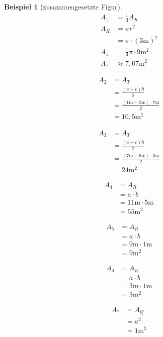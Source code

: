 \documentclass[a4paper]{book}%
\theoremstyle{definition}
\newtheorem{beispiel}{Beispiel}
\begin{document}
\begin{beispiel}[zusammengesetzte Figur]
    \begin{align}
      A_1 &= \frac{1}{4} A_K \\
       A_K &= \pi r^2 \\
       &= \pi \cdot (3\text{m})^2\\
       A_1 &= \frac{1}{4} \pi \cdot 9\text{m}^2\\
       A_1 & \approx 7,07\text{m}^2
    \end{align}

    \begin{align}
      A_2 &= A_T \\
       &= \frac{(a+c)h}{2}\\
       &= \frac{(1\text{m}+2\text{m}) \cdot 7\text{m}}{2}\\
       &= 10,5\text{m}^2
    \end{align}

    \begin{align}
      A_3 &= A_T \\
       &= \frac{(a+c)h}{2}\\
       &= \frac{(7\text{m}+9\text{m}) \cdot 3\text{m}}{2}\\
       &= 24\text{m}^2
    \end{align}

    \begin{align}
      A_4 &= A_R \\
       &= a \cdot b\\
       &= 11\text{m} \cdot 5\text{m}\\
       &= 55\text{m}^2
    \end{align}

    \begin{align}
      A_5 &= A_R \\
       &= a \cdot b\\
       &= 9\text{m} \cdot 1\text{m}\\
       &= 9\text{m}^2
    \end{align}

    \begin{align}
      A_6 &= A_R \\
       &= a \cdot b\\
       &= 3\text{m} \cdot 1\text{m}\\
       &= 3\text{m}^2
    \end{align}

    \begin{align}
      A_7 &= A_Q \\
       &= a^2\\
       &= 1\text{m}^2
    \end{align}


\end{beispiel}
\end{document}
